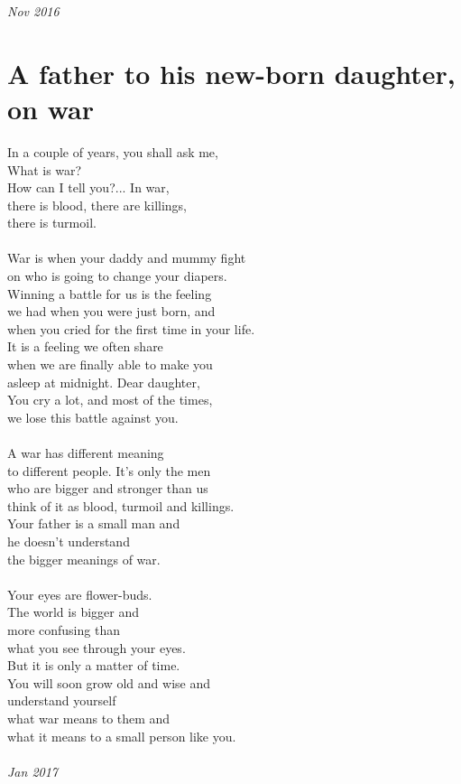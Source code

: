 \documentclass[oneside,12pt]{book}
\begin{document}
\textit{Nov 2016}

\section*{A father to his new-born daughter, on war}
In a couple of years, you shall ask me,\\
What is war? \\
How can I tell you?... In war, \\
there is blood, there are killings,\\
there is turmoil.\\\\
War is when your daddy and mummy fight\\
on who is going to change your diapers.\\
Winning a battle for us is the feeling\\
we had when you were just born, and\\
when you cried for the first time in your life.\\
It is a feeling we often share \\
when we are finally able to make you \\
asleep at midnight. Dear daughter,\\
You cry a lot, and most of the times,\\
we lose this battle against you.\\\\
A war has different meaning\\
to different people. It’s only the men\\
who are bigger and stronger than us \\
think of it as blood, turmoil and killings.\\
Your father is a small man and \\
he doesn’t understand \\
the bigger meanings of war.\\\\
Your eyes are flower-buds.\\
The world is bigger and \\
more confusing than \\
what you see through your eyes.\\
But it is only a matter of time.\\
You will soon grow old and wise and\\
understand yourself \\
what war means to them and \\
what it means to a small person like you.\\\\

\textit{Jan 2017}
\end{document}
